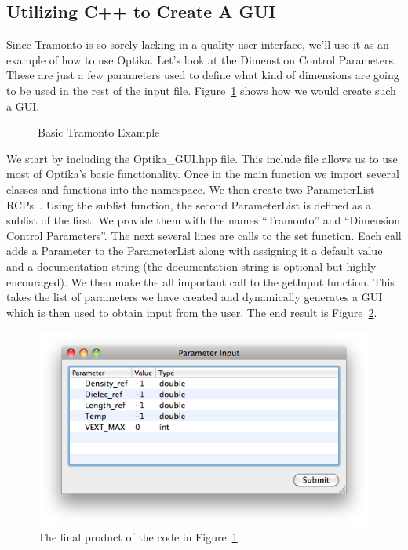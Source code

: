 \subsection{Utilizing C++ to Create A GUI}
Since Tramonto is so sorely lacking in a quality user interface, we'll use it as an example of how to use Optika.
Let's look at the Dimenstion Control Parameters. These are just a few parameters used to define what kind of
dimensions are going to be used in the rest of the input file. Figure~\ref{basicTramonto} shows how we would create
such a GUI.
\begin{figure}
\centering

\caption{Basic Tramonto Example}
\label{basicTramonto}
\end{figure}
We start by including the Optika\_GUI.hpp file. This include file allows us to use most of Optika's basic functionality.
Once in the main function we import several classes and functions into the namespace. We then create two
ParameterList RCPs~\cite{RCP}. Using the sublist function, the second 
ParameterList is defined as a sublist of the first. We provide them with the names ``Tramonto'' and
``Dimension Control Parameters''. The next several lines are calls to the set function. Each call
adds a Parameter to the ParameterList along with assigning it a default value and a documentation string (the 
documentation string is optional but highly encouraged). We then make
the all important call to the getInput function. This takes the list of parameters we have created and dynamically
generates a GUI which is then used to obtain input from the user. The end result is Figure~\ref{BasicTramontoScreenshot}.
\begin{figure}
\centering
\includegraphics[scale=0.5]{graphics/BasicTramontoScreenshot}
\caption{The final product of the code in Figure~\ref{basicTramonto}}
\label{BasicTramontoScreenshot}
\end{figure}

